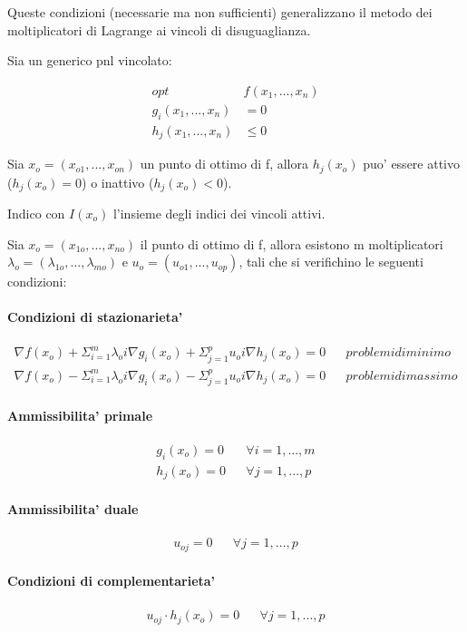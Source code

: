 Queste condizioni (necessarie ma non sufficienti) generalizzano il metodo dei moltiplicatori di Lagrange ai vincoli di disuguaglianza.

Sia un generico pnl vincolato:

\begin{align*}
    opt & f (x_1,...,x_n) \\
    g_i(x_1,...,x_n) &= 0 \\
    h_j(x_1,...,x_n) &\leq 0
\end{align*}

Sia $x_o = (x_{o1},...,x_{on})$ un punto di ottimo di f, allora $h_j(x_o)$ puo' essere attivo ($h_j(x_o) = 0$) o inattivo ($h_j(x_o) < 0$).

Indico con $I(x_o)$ l'insieme degli indici dei vincoli attivi.


Sia $x_o = (x_{1o},...,x_{no})$ il punto di ottimo di f, allora esistono m moltiplicatori $\lambda_o = (\lambda_{1o},...,\lambda_{mo})$ e $u_o = (u_{o1},...,u_{op})$, tali che si verifichino le seguenti condizioni:

\paragraph{Condizioni di stazionarieta'}

\begin{align*}
    \nabla f(x_o) + \Sigma ^ m _ {i=1} \lambda_oi \nabla g_i(x_o) + \Sigma ^ p _ {j=1} u_oi \nabla h_j(x_o) = 0 && problemi di minimo \\
    \nabla f(x_o) - \Sigma ^ m _ {i=1} \lambda_oi \nabla g_i(x_o) - \Sigma ^ p _ {j=1} u_oi \nabla h_j(x_o) = 0 && problemi di massimo
\end{align*}

\paragraph{Ammissibilita' primale}

\begin{align*}
    g_i(x_o) = 0 && \forall i = 1,...,m \\
    h_j(x_o) = 0 && \forall j = 1,...,p
\end{align*}

\paragraph{Ammissibilita' duale}

\begin{align*}
    u_{oj} = 0 && \forall j = 1,...,p
\end{align*}

\paragraph{Condizioni di complementarieta'}

\begin{align*}
    u_{oj} \cdot h_j(x_o) = 0 && \forall j = 1,...,p
\end{align*}
